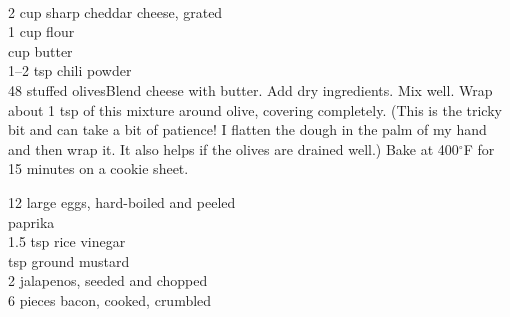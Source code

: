 \begin{minipage}{\linewidth}
\end{minipage}\par\begin{minipage}{\linewidth} 
 \\
\step
	{2 cup sharp cheddar cheese, grated \\
 1 cup flour \\
  cup butter \\
 1--2 tsp chili powder \\
 48 stuffed olives}{Blend cheese with butter. Add dry ingredients. Mix well. Wrap about 1 tsp of this mixture around olive, covering completely. (This is the tricky bit and can take a bit of patience! I flatten the dough in the palm of my hand and then wrap it. It also helps if the olives are drained well.) Bake at 400$^\circ$F for 15 minutes on a cookie sheet.}


\end{minipage}\par\begin{minipage}{\linewidth}  
	\step
	{12 large eggs, hard-boiled and peeled\\
	 paprika\\
	 1.5 tsp rice vinegar	\\
	  tsp ground mustard \\
	 2 jalapenos, seeded and chopped	\\
	 6 pieces bacon, cooked, crumbled
		}{}
		

\end{minipage}
